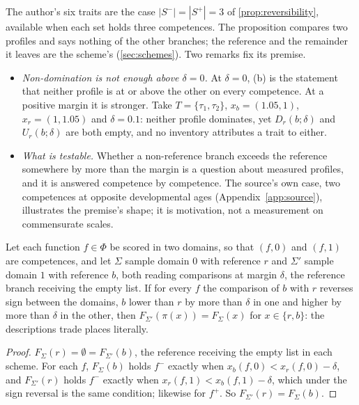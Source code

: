 \noindent The author's six traits are the case $|S^{-}| = |S^{+}| = 3$ of \autoref{prop:reversibility}, available when each set holds three competences. The proposition compares two profiles and says nothing of the other branches; the reference and the remainder it leaves are the scheme's (\autoref{sec:schemes}). Two remarks fix its premise.
\begin{itemize}[leftmargin=*]
\item \emph{Non-domination is not enough above $\delta = 0$.} At $\delta = 0$, (b) is the statement that neither profile is at or above the other on every competence. At a positive margin it is stronger. Take $T = \{\tau_1, \tau_2\}$, $x_b = (1.05, 1)$, $x_r = (1, 1.05)$ and $\delta = 0.1$: neither profile dominates, yet $D_r(b;\delta)$ and $U_r(b;\delta)$ are both empty, and no inventory attributes a trait to either.
\item \emph{What is testable.} Whether a non-reference branch exceeds the reference somewhere by more than the margin is a question about measured profiles, and it is answered competence by competence. The source's own case, two competences at opposite developmental ages (Appendix~\ref{app:source}), illustrates the premise's shape; it is motivation, not a measurement on commensurate scales.
\end{itemize}

\begin{corollary}
\label{cor:literal}
Let each function $f \in \Phi$ be scored in two domains, so that $(f, 0)$ and $(f, 1)$ are competences, and let $\Sigma$ sample domain $0$ with reference $r$ and $\Sigma'$ sample domain $1$ with reference $b$, both reading comparisons at margin $\delta$, the reference branch receiving the empty list. If for every $f$ the comparison of $b$ with $r$ reverses sign between the domains, $b$ lower than $r$ by more than $\delta$ in one and higher by more than $\delta$ in the other, then $F_{\Sigma'}(\pi(x)) = F_\Sigma(x)$ for $x \in \{r, b\}$: the descriptions trade places literally.
\end{corollary}
\begin{proof}
$F_\Sigma(r) = \emptyset = F_{\Sigma'}(b)$, the reference receiving the empty list in each scheme. For each $f$, $F_\Sigma(b)$ holds $f^{-}$ exactly when $x_b(f,0) < x_r(f,0) - \delta$, and $F_{\Sigma'}(r)$ holds $f^{-}$ exactly when $x_r(f,1) < x_b(f,1) - \delta$, which under the sign reversal is the same condition; likewise for $f^{+}$. So $F_{\Sigma'}(r) = F_\Sigma(b)$.
\end{proof}

